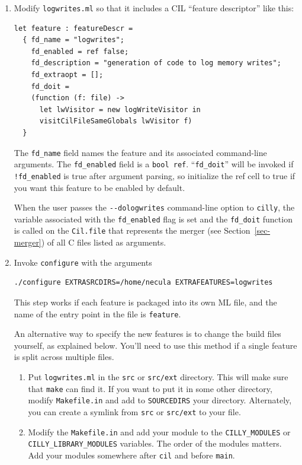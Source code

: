 \documentclass[letterpaper]{article}
\def\secref#1{Section~\ref{sec-#1}}
\def\t#1{{\tt #1}}
\begin{document}
 \begin{enumerate}

 \item Modify \t{logwrites.ml} so that it includes a CIL ``feature
 descriptor'' like this:
\begin{verbatim}
let feature : featureDescr =
  { fd_name = "logwrites";
    fd_enabled = ref false;
    fd_description = "generation of code to log memory writes";
    fd_extraopt = [];
    fd_doit =
    (function (f: file) ->
      let lwVisitor = new logWriteVisitor in
      visitCilFileSameGlobals lwVisitor f)
  }
\end{verbatim}
  The \t{fd\_name} field names the feature and its associated
  command-line arguments. The \t{fd\_enabled} field is a \t{bool ref}.
  ``\t{fd\_doit}'' will be invoked if \t{!fd\_enabled} is true after
  argument parsing, so initialize the ref cell to true if you want
  this feature to be enabled by default.

  When the user passes the \t{-{}-{}dologwrites}
  command-line option to \t{cilly}, the variable associated with the
  \t{fd\_enabled} flag is set and the \t{fd\_doit} function is called
  on the \t{Cil.file} that represents the merger (see \secref{merger}) of
  all C files listed as arguments.

 \item Invoke \t{configure} with the arguments
\begin{verbatim}
./configure EXTRASRCDIRS=/home/necula EXTRAFEATURES=logwrites
\end{verbatim}

 This step works if each feature is packaged into its own ML file, and the
name of the entry point in the file is \t{feature}.

 An alternative way to specify the new features is to change the build files
yourself, as explained below.  You'll need to use this method if a single
feature is split across multiple files.

\begin{enumerate}
 \item Put \t{logwrites.ml} in the \t{src} or \t{src/ext} directory. This
 will make sure that \t{make} can find it. If you want to put it in some
 other directory, modify \t{Makefile.in} and add to \t{SOURCEDIRS} your
 directory.  Alternately, you can create a symlink from \t{src} or
 \t{src/ext} to your file.

 \item Modify the \t{Makefile.in} and add your module to the
 \t{CILLY\_MODULES} or
 \t{CILLY\_LIBRARY\_MODULES} variables. The order of the modules matters. Add
 your modules somewhere after \t{cil} and before \t{main}.


\end{enumerate}
\end{enumerate}
\end{document}
